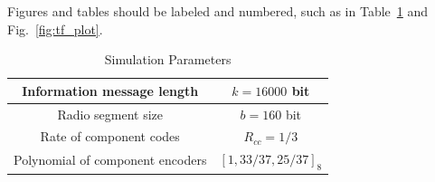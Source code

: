 \documentclass[journal, a4paper]{IEEEtran}
\begin{document}
    Figures and tables should be labeled and numbered, such as in Table~\ref{tab:simParameters} and Fig.~\ref{fig:tf_plot}.

    \begin{table}[!hbt]
        \begin{center}
        \caption{Simulation Parameters}
        \label{tab:simParameters}
        \begin{tabular}{|c|c|}
            \hline
            Information message length & $k=16000$ bit \\
            \hline
            Radio segment size & $b=160$ bit \\
            \hline
            Rate of component codes & $R_{cc}=1/3$\\
            \hline
            Polynomial of component encoders & $[1 , 33/37 , 25/37]_8$\\
            \hline
        \end{tabular}
        \end{center}
    \end{table}

\end{document}
